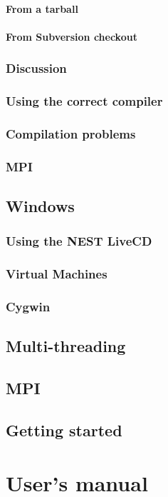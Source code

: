 \documentclass[a4paper,10pt]{report}
\begin{document}
\subsubsection{From a tarball}
\subsubsection{From Subversion checkout}
\subsection{Discussion}
\subsection{Using the correct compiler}
\subsection{Compilation problems}
\subsection{MPI}
\section{Windows}
\subsection{Using the NEST LiveCD}
\subsection{Virtual Machines}
\subsection{Cygwin}
\section{Multi-threading}
\section{MPI}
\section{Getting started}
\chapter{User's manual}
\end{document}
